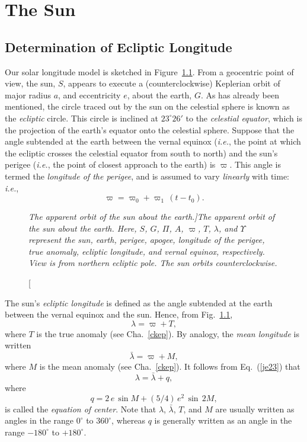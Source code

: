 \chapter{The Sun}\label{csun}
\section{Determination of Ecliptic Longitude}\label{ssun}
Our solar longitude model is sketched in Figure~\ref{lf3}. From a geocentric point of view, the sun, $S$,  appears to execute
a (counterclockwise) Keplerian orbit of major radius $a$, and eccentricity $e$, about the
earth, $G$. As has already been mentioned, the circle traced out by the sun on the celestial sphere is
known as the {\em ecliptic}\/ circle. This circle is inclined at $23^\circ 26'$ to
the {\em celestial equator}, which is the projection of the earth's equator onto
the celestial sphere.
 Suppose that the angle subtended at the earth between the vernal equinox ({\em i.e.}, the point at which the ecliptic crosses the celestial equator from
south to north) and the
sun's perigee ({\em i.e.}, the point of closest approach to the earth)   is
 $\varpi$. This
angle is termed the {\em longitude of the perigee}, and
 is assumed
to vary {\em linearly}\/ with time: {\em i.e.}, 
\begin{equation}\label{ae79}
\varpi  = \varpi_0 + \varpi_1\,(t-t_0).
\end{equation}
\begin{figure}[h]
\epsfysize=3in
\centerline{}
\caption[\em The apparent orbit of the sun about the earth.]{\em The apparent orbit of the sun about the earth.  Here, $S$, $G$, $\Pi$, $A$, $\varpi$, $T$,  $\lambda$, and $\Upsilon$
represent the sun, earth, perigee, apogee, longitude of the perigee, true anomaly, ecliptic longitude, and
vernal equinox, respectively. View is from northern ecliptic pole. The sun orbits counterclockwise.}\label{lf3}
\end{figure}

 The sun's {\em ecliptic
longitude}\/ is defined as the angle subtended at the earth between the vernal equinox and the sun.
Hence, from Fig.~\ref{lf3},
\begin{equation}
\lambda = \varpi + T,
\end{equation}
where $T$ is the true anomaly (see Cha.~\ref{ckep}). By analogy, the  {\em mean longitude}\/ is written
\begin{equation}
\bar{\lambda} = \varpi + M,
\end{equation}
where $M$ is the  mean anomaly (see Cha.~\ref{ckep}). It follows from Eq.~(\ref{je23}) that
\begin{equation}\label{ae82}
\lambda = \bar{\lambda}  + q,
\end{equation}
where
\begin{equation}
q = 2\,e\,\sin M + (5/4)\,e^2\,\sin\,2M,
\end{equation}
 is called  the {\em equation of  center}. Note that $\lambda$, $\bar{\lambda}$, $T$, and $M$ are usually written as angles in the range
 $0^\circ$ to $360^\circ$, whereas $q$ is generally written as an
 angle in the range $-180^\circ$ to $+180^\circ$. 

